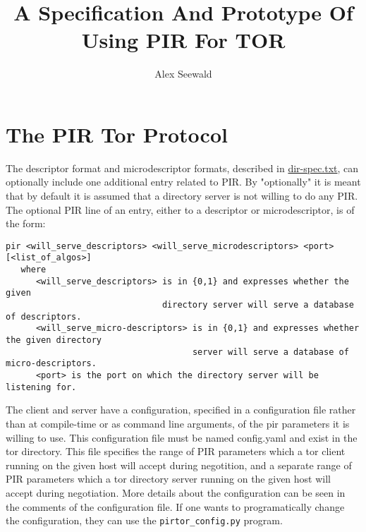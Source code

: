 \documentclass{article}
\title{A Specification And Prototype Of Using PIR For TOR}
\author{Alex Seewald}
\begin{document}
\maketitle
\section{The PIR Tor Protocol}

    The descriptor format and microdescriptor formats, described in \href{https://gitweb.torproject.org/torspec.git/tree/dir-spec.txt}{dir-spec.txt}, can optionally include one additional entry related to PIR. By "optionally" it is meant that by default it is assumed that a directory server is not willing to do any PIR. The optional PIR line of an entry, either to a descriptor or microdescriptor, is of the form:
\begin{verbatim}
pir <will_serve_descriptors> <will_serve_microdescriptors> <port> [<list_of_algos>]
   where
      <will_serve_descriptors> is in {0,1} and expresses whether the given
                               directory server will serve a database of descriptors.
      <will_serve_micro-descriptors> is in {0,1} and expresses whether the given directory
                                     server will serve a database of micro-descriptors.
      <port> is the port on which the directory server will be listening for.
\end{verbatim}
    
    The client and server have a configuration, specified in a configuration file rather than at compile-time or as command line arguments, of the pir parameters it is willing to use. This configuration file must be named config.yaml and exist in the tor directory. This file specifies the range of PIR parameters which a tor client running on the given host will accept during negotition, and a separate range of PIR parameters which a tor directory server running on the given host will accept during negotiation. More details about the configuration can be seen in the comments of the configuration file. If one wants to programatically change the configuration, they can use the \texttt{pirtor\_config.py} program.
\end{document}
